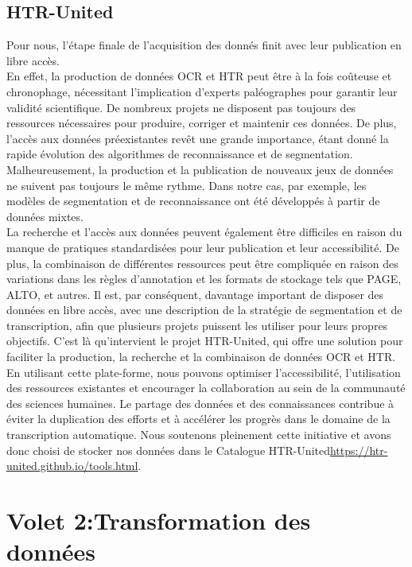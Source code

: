 \documentclass[a4paper, twoside, 12pt]{book}
\begin{document}
\subsection{HTR-United}

Pour nous, l'étape finale de l'acquisition des donnés finit avec leur publication en libre accès.\\

En effet, la production de données OCR et HTR peut être à la fois coûteuse et chronophage, nécessitant l'implication d'experts paléographes pour garantir leur validité scientifique. De nombreux projets ne disposent pas toujours des ressources nécessaires pour produire, corriger et maintenir ces données. De plus, l'accès aux données préexistantes revêt une grande importance, étant donné la rapide évolution des algorithmes de reconnaissance et de segmentation. Malheureusement, la production et la publication de nouveaux jeux de données ne suivent pas toujours le même rythme. Dans notre cas, par exemple, les modèles de segmentation et de reconnaissance ont été développés à partir de données mixtes.\\

La recherche et l'accès aux données peuvent également être difficiles en raison du manque de pratiques standardisées pour leur publication et leur accessibilité. De plus, la combinaison de différentes ressources peut être compliquée en raison des variations dans les règles d'annotation et les formats de stockage tels que PAGE, ALTO, et autres. Il est, par conséquent, davantage important de disposer des données en libre accès, avec une description de la stratégie de segmentation et de transcription, afin que plusieurs projets puissent les utiliser pour leurs propres objectifs. C'est là qu'intervient le projet HTR-United, qui offre une solution pour faciliter la production, la recherche et la combinaison de données OCR et HTR. En utilisant cette plate-forme, nous pouvons optimiser l'accessibilité, l'utilisation des ressources existantes et encourager la collaboration au sein de la communauté des sciences humaines. Le partage des données et des connaissances contribue à éviter la duplication des efforts et à accélérer les progrès dans le domaine de la transcription automatique. Nous soutenons pleinement cette initiative et avons donc choisi de stocker nos données dans le Catalogue HTR-United\url{https://htr-united.github.io/tools.html}.


\section{Volet 2:Transformation des données}
\end{document}
